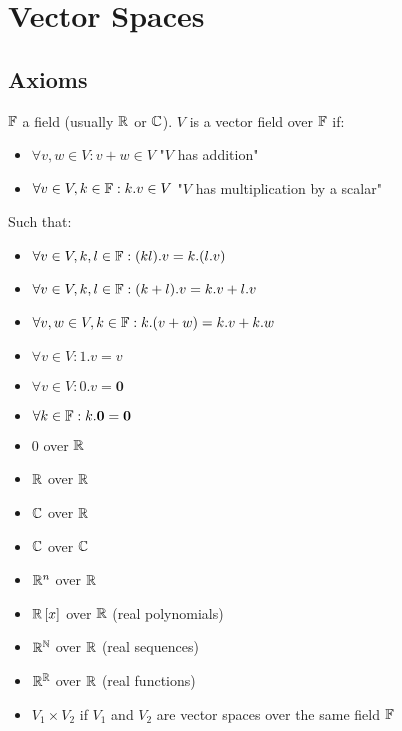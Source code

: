 \chapter{Vector Spaces}
\section{Axioms}
\begin{definition}
	$\mathbb{F}$ a field (usually $\mathbb{R}$ or $\mathbb{C}$).
	$V$ is a vector field over $\mathbb{F}$ if:
	\begin{itemize}
		\item $\forall v,w \in V: v+w \in V$ "$V$ has addition"
		\item $\forall v \in V, k \in \mathbb{F}: k.v \in V$ "$V$ has multiplication by a scalar"
	\end{itemize}
	Such that:
	\begin{itemize}
		\item $\forall v \in V, k,l \in \mathbb{F}: (kl).v = k.(l.v)$
		\item $\forall v \in V, k,l \in \mathbb{F}: (k+l).v = k.v + l.v$
		\item $\forall v,w \in V, k \in \mathbb{F}: k.(v+w) = k.v + k.w$
		\item $\forall v \in V: 1.v=v$
		\item $\forall v \in V: 0.v=\textbf{0}$
		\item $\forall k \in \mathbb{F}: k.\textbf{0}=\textbf{0}$
	\end{itemize}
\end{definition}
\begin{example}
	\begin{itemize}
		\item $0$ over $\mathbb{R}$
		\item $\mathbb{R}$ over $\mathbb{R}$
		\item $\mathbb{C}$ over $\mathbb{R}$
		\item $\mathbb{C}$ over $\mathbb{C}$
		\item $\mathbb{R}^n$ over $\mathbb{R}$
		\item $\mathbb{R}\left[x\right]$ over $\mathbb{R}$ (real polynomials)
		\item $\mathbb{R}^{\mathbb{N}}$ over $\mathbb{R}$ (real sequences)
		\item $\mathbb{R}^{\mathbb{R}}$ over $\mathbb{R}$ (real functions)
		\item $V_1 \times V_2$ if $V_1$ and $V_2$ are vector spaces over the same field $\mathbb{F}$
	\end{itemize}
\end{example}

